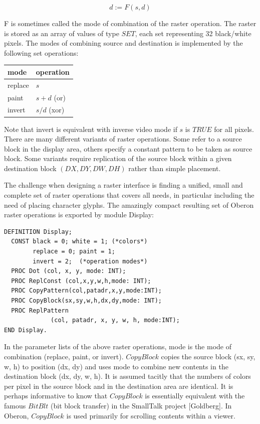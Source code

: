 \[ d := F(s, d) \]

F is sometimes called the mode of combination of the raster operation. The raster is stored as an
array of values of type $SET$, each set representing 32 black/white pixels. The modes of combining
source and destination is implemented by the following set operations:
\begin{table}[h!]
	\centering
	\begin{tabular}{l l}
		mode    & operation \\\hline
		replace & $s$ \\
		paint   & $s + d$ (or) \\
		invert  & $s / d$ (xor)
	\end{tabular}
\end{table}
Note that invert is equivalent with inverse video mode if $s$ is $TRUE$ for all pixels.
There are many different variants of raster operations. Some refer to a source block in the display
area, others specify a constant pattern to be taken as source block. Some variants require
replication of the source block within a given destination block $(DX, DY, DW, DH)$ rather than
simple placement.

The challenge when designing a raster interface is finding a unified, small and complete set of
raster operations that covers all needs, in particular including the need of placing character
glyphs. The amazingly compact resulting set of Oberon raster operations is exported by module
Display:
\begin{verbatim}
DEFINITION Display;
  CONST black = 0; white = 1; (*colors*)
        replace = 0; paint = 1;
        invert = 2;  (*operation modes*)
  PROC Dot (col, x, y, mode: INT);
  PROC ReplConst (col,x,y,w,h,mode: INT);
  PROC CopyPattern(col,patadr,x,y,mode:INT);
  PROC CopyBlock(sx,sy,w,h,dx,dy,mode: INT);
  PROC ReplPattern
             (col, patadr, x, y, w, h, mode:INT);
END Display.
\end{verbatim}
In the parameter lists of the above raster operations, mode is the mode of combination (replace,
paint, or invert). $CopyBlock$ copies the source block (sx, sy, w, h) to position (dx, dy) and uses
mode to combine new contents in the destination block (dx, dy, w, h). It is assumed tacitly that the
numbers of colors per pixel in the source block and in the destination area are identical. It is
perhaps informative to know that $CopyBlock$ is essentially equivalent with the famous $BitBlt$ (bit
block transfer) in the SmallTalk project [Goldberg]. In Oberon, $CopyBlock$ is used primarily for
scrolling contents within a viewer.


